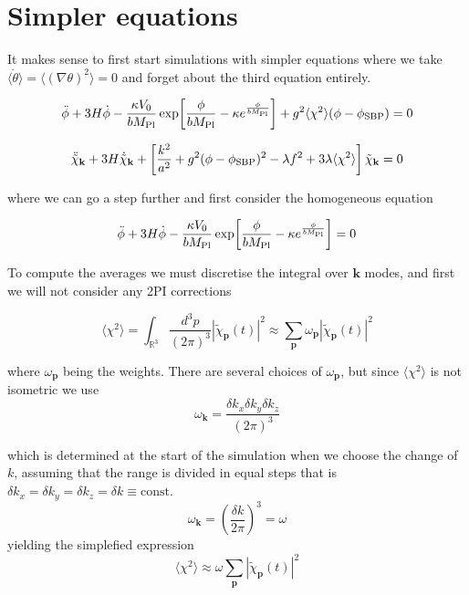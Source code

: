 \section{Simpler equations}
It makes sense to first start simulations with simpler equations where we take $\langle \dot{\theta} \rangle = \langle (\nabla \theta)^2 \rangle = 0$ and forget about the third equation entirely.

\begin{equation}
    \ddot{\phi} + 3H \dot{\phi}
    - \frac{\kappa V_0}{b M_{\rm Pl}}
    \exp\!\left[\frac{\phi}{b M_{\rm Pl}} - \kappa e^{\frac{\phi}{b M_{\rm Pl}}}\right]
    + g^2 \langle \chi^2 \rangle (\phi - \phi_{\rm SBP}) = 0
\end{equation}

\begin{equation}
    \ddot{\tilde{\chi}}_{\mathbf{k}} + 3H \dot{\tilde{\chi}}_{\mathbf{k}}
    + \left[
    \frac{k^2}{a^2}
    + g^2 (\phi - \phi_{\rm SBP})^2
    - \lambda f^2
    + 3 \lambda \langle \chi^2 \rangle
    \right]
    \tilde{\chi}_{\mathbf{k}} = 0
\end{equation}

where we can go a step further and first consider the homogeneous equation

\begin{equation}
    \ddot{\phi} + 3H \dot{\phi}
    - \frac{\kappa V_0}{b M_{\rm Pl}}
    \exp\!\left[\frac{\phi}{b M_{\rm Pl}} - \kappa e^{\frac{\phi}{b M_{\rm Pl}}}\right] = 0
\end{equation}

To compute the averages we must discretise the integral over $\textbf{k}$ modes, and first we will not consider any 2PI corrections

\begin{equation*}
    \langle \chi^2 \rangle = \int_{\mathbb{R}^3} \frac{d^3 p }{(2 \pi)^3} |\tilde{\chi}_{\textbf{p}} (t)|^2 \approx \sum_{\textbf{p}} \omega_\textbf{p} |\tilde{\chi}_\textbf{p} (t)|^2 
\end{equation*}

where $\omega_\textbf{p}$ being the weights. There are several choices of $\omega_{\textbf{p}}$, but since $\langle \chi^2 \rangle$ is not isometric we use
\begin{equation*}
    \omega_{\textbf{k}} = \frac{\delta k_x  \delta k_y \delta k_z}{ (2 \pi)^3 }
\end{equation*}

 which is determined at the start of the simulation when we choose the change of $k$, assuming that the range is divided in equal steps that is $\delta k_x = \delta k_y = \delta k_z = \delta k \equiv \text{const}$. 
\begin{equation*}
    \omega_{\mathbf{k}} = \left( \frac{\delta k}{2 \pi} \right)^3 = \omega
\end{equation*}
yielding the simplefied expression
\begin{equation*}
    \langle \chi^2 \rangle \approx \omega \sum_{\textbf{p}} |\tilde{\chi}_\textbf{p} (t)|^2
\end{equation*}

